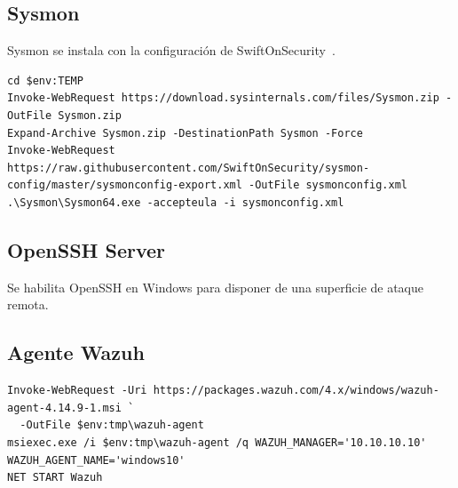 \subsection{Sysmon}
Sysmon se instala con la configuración de SwiftOnSecurity~\cite{swiftonsecurity}.

\begin{lstlisting}[caption={Instalación de Sysmon (PowerShell como administrador)},label=lst:sysmon]
cd $env:TEMP
Invoke-WebRequest https://download.sysinternals.com/files/Sysmon.zip -OutFile Sysmon.zip
Expand-Archive Sysmon.zip -DestinationPath Sysmon -Force
Invoke-WebRequest https://raw.githubusercontent.com/SwiftOnSecurity/sysmon-config/master/sysmonconfig-export.xml -OutFile sysmonconfig.xml
.\Sysmon\Sysmon64.exe -accepteula -i sysmonconfig.xml
\end{lstlisting}


\subsection{OpenSSH Server}
Se habilita OpenSSH en Windows para disponer de una superficie de ataque
remota.


\subsection{Agente Wazuh}
\begin{lstlisting}[caption={Instalación del agente Wazuh en Windows},label=lst:agente-win]
Invoke-WebRequest -Uri https://packages.wazuh.com/4.x/windows/wazuh-agent-4.14.9-1.msi `
  -OutFile $env:tmp\wazuh-agent
msiexec.exe /i $env:tmp\wazuh-agent /q WAZUH_MANAGER='10.10.10.10' WAZUH_AGENT_NAME='windows10'
NET START Wazuh
\end{lstlisting}





